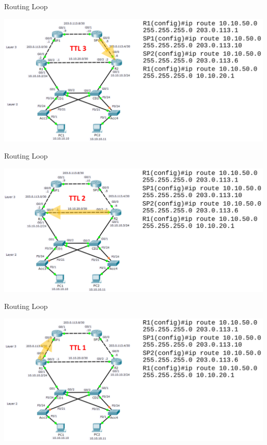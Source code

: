 \documentclass[pdflatex,compress,mathserif]{beamer}
\begin{document}
\begin{frame}{Routing Loop}
	\begin{center}
		\includegraphics[width=\linewidth]{img/img19}
	\end{center}
\end{frame}

\begin{frame}{Routing Loop}
	\begin{center}
		\includegraphics[width=\linewidth]{img/img20}
	\end{center}
\end{frame}

\begin{frame}{Routing Loop}
	\begin{center}
		\includegraphics[width=\linewidth]{img/img21}
	\end{center}
\end{frame}
\end{document}
